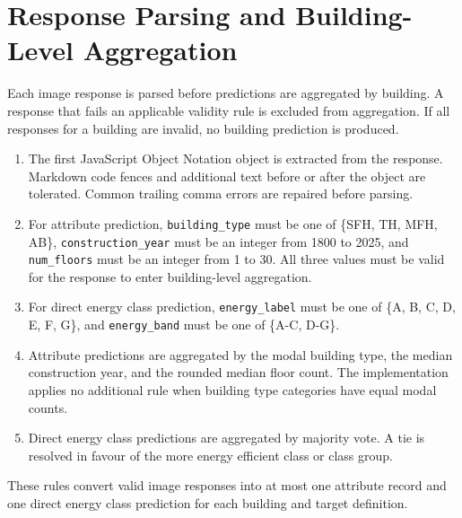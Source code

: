 \section{Response Parsing and Building-Level Aggregation}
\label{sec:appendix_d_parsing_rules}

Each image response is parsed before predictions are aggregated by building.
A response that fails an applicable validity rule is excluded from aggregation.
If all responses for a building are invalid, no building prediction is produced.

\begin{enumerate}
	\item The first JavaScript Object Notation object is extracted from the response. Markdown code fences and additional text before or after the object are tolerated. Common trailing comma errors are repaired before parsing.
	\item For attribute prediction, \texttt{building\_type} must be one of \{SFH, TH, MFH, AB\}, \texttt{construction\_year} must be an integer from 1800 to 2025, and \texttt{num\_floors} must be an integer from 1 to 30. All three values must be valid for the response to enter building-level aggregation.
	\item For direct energy class prediction, \texttt{energy\_label} must be one of \{A, B, C, D, E, F, G\}, and \texttt{energy\_band} must be one of \{A-C, D-G\}.
	\item Attribute predictions are aggregated by the modal building type, the median construction year, and the rounded median floor count. The implementation applies no additional rule when building type categories have equal modal counts.
	\item Direct energy class predictions are aggregated by majority vote. A tie is resolved in favour of the more energy efficient class or class group.
\end{enumerate}

These rules convert valid image responses into at most one attribute record and one direct energy class prediction for each building and target definition.
